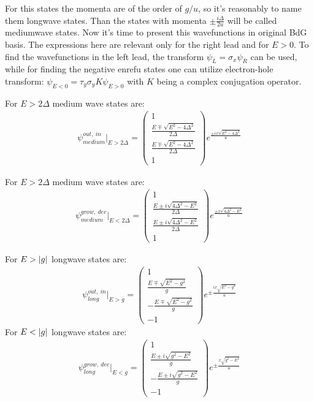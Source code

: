 For this states the momenta are of the order of $ g/u $, so it's reasonably to name them longwave states. Than the states with momenta $ \pm\frac{i\Delta}{2u} $ will be called mediumwave states.
Now it's time to present this wavefunctions in original BdG basis. The expressions here are relevant only for the right lead and for $ E>0 $. To find the wavefunctions in the left lead, the transform $ \psi_L=\sigma_x\psi_R $ can be used, while for finding the negative enrefu states one can utilize electron-hole transform: $ \psi_{E<0}= \tau_y\sigma_yK\psi_{E>0}$ with $ K $ being a complex conjugation operator.

For $ E>2\Delta $ medium wave states are:
\begin{gather}
	\psi^{out,~in}_{medium}
	\bigg|_{E>2\Delta}
	=
	\begin{pmatrix}
	1
	\\
	\frac{E\mp\sqrt{E^2-4\Delta^2}}{2\Delta}
	\\
	\frac{E\mp\sqrt{E^2-4\Delta^2}}{2\Delta}
	\\
	1
	\end{pmatrix}
	e^\frac{\pm i x\sqrt{E^2-4\Delta^2}}{u}
	\end{gather}
	
	For $ E>2\Delta $ medium wave states are:
	\begin{gather}
	\label{medium_dec_wave_functions}
	\psi^{grow,~dec}_{medium}
	\bigg|_{E<2\Delta}
	=
	\begin{pmatrix}
	1
	\\
	\frac{E\pm i\sqrt{4\Delta^2-E^2}}{2\Delta}
	\\
	\frac{E\pm i\sqrt{4\Delta^2-E^2}}{2\Delta}
	\\
	1
	\end{pmatrix}
	e^\frac{\pm  x\sqrt{4\Delta^2-E^2}}{u}
\end{gather}

For $ E>\left|g\right| $ longwave states are:
\begin{gather}
		\psi^{out,~in}_{long}
		\bigg|_{E>g}
=
\begin{pmatrix}
1\\
\frac{E\mp \sqrt{E^2-g^2}}{g}\\
-\frac{E\mp \sqrt{E^2-g^2}}{g}\\
-1
\end{pmatrix}
e^{\pm\frac{ix\sqrt{E^2-g^2}}{u}}
\end{gather}
For $ E<\left|g\right| $ longwave states are:
\begin{gather}
	\label{long_dec_wave_functions}
	\psi^{grow,~dec}_{long}
	\bigg|_{E<g}
	=
	\begin{pmatrix}
	1\\
	\frac{E\pm i\sqrt{g^2-E^2}}{g}\\
	-\frac{E\pm i\sqrt{g^2-E^2}}{g}\\
	-1
	\end{pmatrix}
	e^{\pm\frac{x\sqrt{g^2-E^2}}{u}}
\end{gather}


